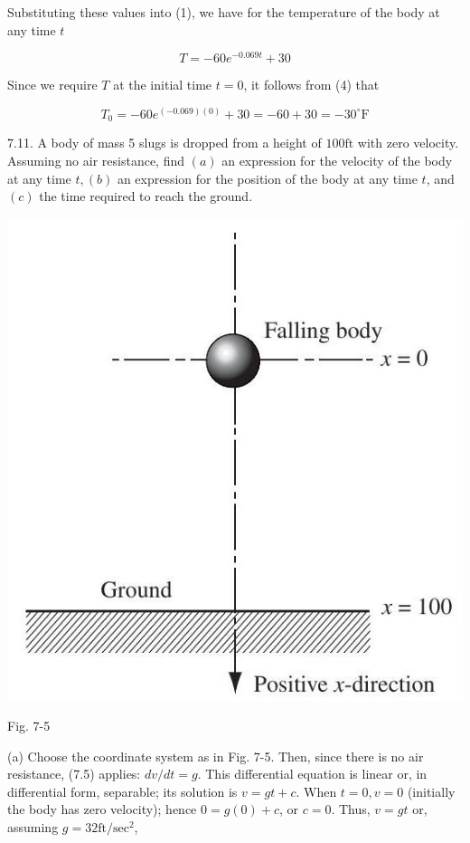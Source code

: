 \documentclass[10pt]{article}
\begin{document}
Substituting these values into (1), we have for the temperature of the body at any time $t$


\begin{equation*}
T=-60 e^{-0.069 t}+30 \tag{4}
\end{equation*}


Since we require $T$ at the initial time $t=0$, it follows from (4) that

$$
T_{0}=-60 e^{(-0.069)(0)}+30=-60+30=-30^{\circ} \mathrm{F}
$$

7.11. A body of mass 5 slugs is dropped from a height of $100 \mathrm{ft}$ with zero velocity. Assuming no air resistance, find $(a)$ an expression for the velocity of the body at any time $t,(b)$ an expression for the position of the body at any time $t$, and $(c)$ the time required to reach the ground.

\begin{center}
\includegraphics[max width=\textwidth]{2024_04_03_5bb5b4275a64cb9887d1g-078}
\end{center}

Fig. 7-5

(a) Choose the coordinate system as in Fig. 7-5. Then, since there is no air resistance, (7.5) applies: $d v / d t=g$. This differential equation is linear or, in differential form, separable; its solution is $v=g t+c$. When $t=0, v=0$ (initially the body has zero velocity); hence $0=g(0)+c$, or $c=0$. Thus, $v=g t$ or, assuming $g=32 \mathrm{ft} / \mathrm{sec}^{2}$,
\end{document}
